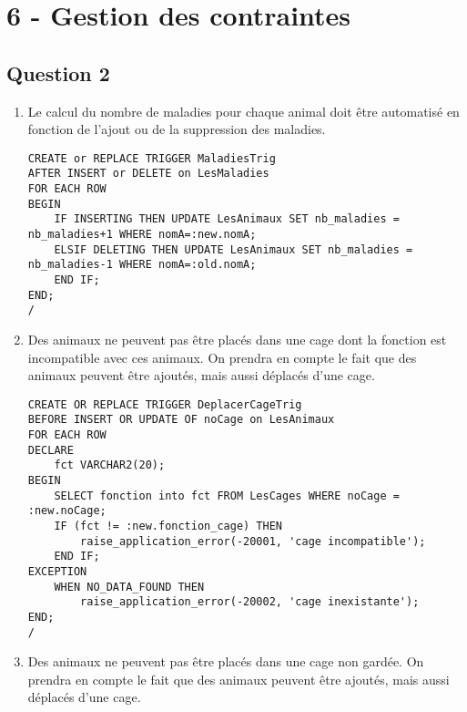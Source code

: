 \documentclass{article}
\begin{document}
\section*{6 - Gestion des contraintes}
\subsection*{Question 2}
\begin{enumerate}[label=\arabic*)]
	\item Le calcul du nombre de maladies pour chaque animal doit être automatisé en fonction de l’ajout
ou de la suppression des maladies.

\lstset{language=SQL}
\begin{lstlisting}
CREATE or REPLACE TRIGGER MaladiesTrig
AFTER INSERT or DELETE on LesMaladies
FOR EACH ROW
BEGIN
	IF INSERTING THEN UPDATE LesAnimaux SET nb_maladies = nb_maladies+1 WHERE nomA=:new.nomA;
	ELSIF DELETING THEN UPDATE LesAnimaux SET nb_maladies = nb_maladies-1 WHERE nomA=:old.nomA;
	END IF;
END;
/
\end{lstlisting}

	\item Des animaux ne peuvent pas être placés dans une cage dont la fonction est incompatible avec
ces animaux. On prendra en compte le fait que des animaux peuvent être ajoutés, mais aussi
déplacés d’une cage.

\begin{lstlisting}
CREATE OR REPLACE TRIGGER DeplacerCageTrig
BEFORE INSERT OR UPDATE OF noCage on LesAnimaux
FOR EACH ROW
DECLARE
	fct VARCHAR2(20);
BEGIN
	SELECT fonction into fct FROM LesCages WHERE noCage = :new.noCage;
	IF (fct != :new.fonction_cage) THEN
		raise_application_error(-20001, 'cage incompatible');
	END IF;
EXCEPTION 
	WHEN NO_DATA_FOUND THEN
		raise_application_error(-20002, 'cage inexistante');
END;
/
\end{lstlisting}
	\item Des animaux ne peuvent pas être placés dans une cage non gardée. On prendra en compte le
fait que des animaux peuvent être ajoutés, mais aussi déplacés d’une cage.


\end{enumerate}
\end{document}
